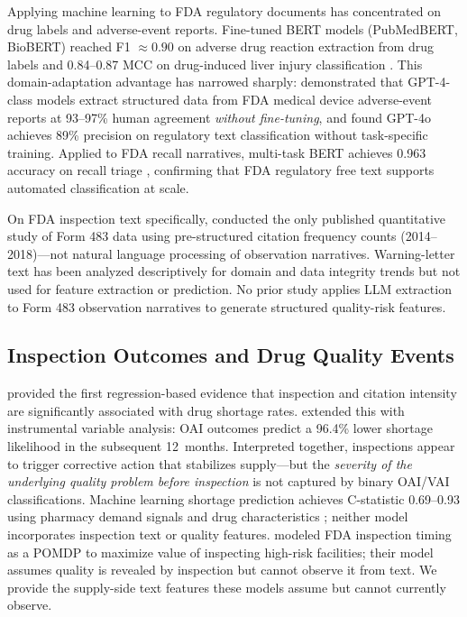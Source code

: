 \documentclass[12pt]{article}
\begin{document}
Applying machine learning to FDA regulatory documents has concentrated on drug
labels and adverse-event reports.
Fine-tuned BERT models (PubMedBERT, BioBERT) reached F1 $\approx 0.90$ on
adverse drug reaction extraction from drug labels \citep{Tatonetti2025OnSIDES,
Bayer2021} and 0.84--0.87 MCC on drug-induced liver injury classification
\citep{Wu2021BERT}.
This domain-adaptation advantage has narrowed sharply: \citet{Li2026LLMDevice}
demonstrated that GPT-4-class models extract structured data from FDA medical
device adverse-event reports at 93--97\% human agreement \emph{without
fine-tuning}, and \citet{Hassani2025} found GPT-4o achieves 89\% precision on
regulatory text classification without task-specific training.
Applied to FDA recall narratives, multi-task BERT achieves 0.963 accuracy on
recall triage \citep{Atalay2026RecallRisk}, confirming that FDA regulatory
free text supports automated classification at scale.

On FDA inspection text specifically, \citet{Pazhayattil2020} conducted the
only published quantitative study of Form 483 data using pre-structured
citation frequency counts (2014--2018)---not natural language processing of
observation narratives.
Warning-letter text has been analyzed descriptively for domain and data
integrity trends \citep{Rathore2022, Park2025DataIntegrity, Kwiecinski2024}
but not used for feature extraction or prediction.
No prior study applies LLM extraction to Form 483 observation narratives to
generate structured quality-risk features.

\subsection{Inspection Outcomes and Drug Quality Events}

\citet{Stomberg2018} provided the first regression-based evidence that
inspection and citation intensity are significantly associated with drug
shortage rates.
\citet{Wang2025MSOM} extended this with instrumental variable analysis: OAI
outcomes predict a 96.4\% lower shortage likelihood in the subsequent
12~months.
Interpreted together, inspections appear to trigger corrective action that
stabilizes supply---but the \emph{severity of the underlying quality problem
before inspection} is not captured by binary OAI/VAI classifications.
Machine learning shortage prediction achieves C-statistic 0.69--0.93 using
pharmacy demand signals and drug characteristics \citep{Liu2021, Pall2023};
neither model incorporates inspection text or quality features.
\citet{Kosmas2023} modeled FDA inspection timing as a POMDP to maximize
value of inspecting high-risk facilities; their model assumes quality is
revealed by inspection but cannot observe it from text.
We provide the supply-side text features these models assume but cannot
currently observe.
\end{document}
